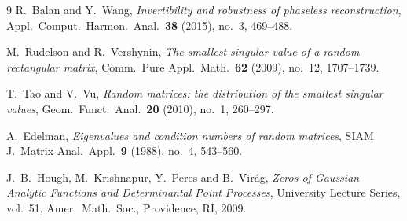 \documentclass[11pt]{amsart}
\numberwithin{equation}{section}
\theoremstyle{definition}
\theoremstyle{remark}
\begin{document}
\begin{thebibliography}{9}
R.~Balan and Y.~Wang,
\emph{Invertibility and robustness of phaseless reconstruction},
Appl.\ Comput.\ Harmon.\ Anal.\ \textbf{38} (2015), no.~3, 469--488.

M.~Rudelson and R.~Vershynin,
\emph{The smallest singular value of a random rectangular matrix},
Comm.\ Pure Appl.\ Math.\ \textbf{62} (2009), no.~12, 1707--1739.

T.~Tao and V.~Vu,
\emph{Random matrices: the distribution of the smallest singular values},
Geom.\ Funct.\ Anal.\ \textbf{20} (2010), no.~1, 260--297.

A.~Edelman,
\emph{Eigenvalues and condition numbers of random matrices},
SIAM J.\ Matrix Anal.\ Appl.\ \textbf{9} (1988), no.~4, 543--560.

J.~B.~Hough, M.~Krishnapur, Y.~Peres and B.~Vir\'ag,
\emph{Zeros of Gaussian Analytic Functions and Determinantal Point Processes},
University Lecture Series, vol.~51, Amer.\ Math.\ Soc., Providence, RI, 2009.

\end{thebibliography}
\end{document}
